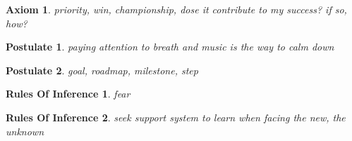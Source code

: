 \documentclass{article}
\newtheorem{axiom}{Axiom}
\newtheorem{postulate}{Postulate}
\newtheorem{rules of inference}{Rules Of Inference}
\begin{document}
\begin{axiom}
    priority,
    win, championship,
    dose it contribute to my success? if so, how?
\end{axiom}

\begin{postulate}
    paying attention to breath and music is the way to calm down
\end{postulate}

\begin{postulate}
    goal,
    roadmap,
    milestone,
    step
\end{postulate}

\begin{rules of inference}
    fear
\end{rules of inference}

\begin{rules of inference}
    seek support system to learn when facing the new, the unknown
\end{rules of inference}
\end{document}
